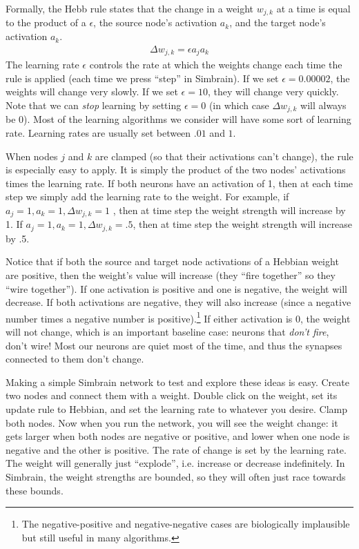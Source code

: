 Formally,  the Hebb rule states that the change in a weight $w_{j,k}$ at a time is 
equal to the product of a  $\epsilon$, the source node's 
activation $a_k$, and the target node's activation $a_k$. 
\begin{eqnarray*}
\Delta w_{j,k} = \epsilon a_j a_k
\end{eqnarray*}
The learning rate $\epsilon$ controls the rate at which the weights change each time the rule is applied (each time we press ``step'' in Simbrain). If we set $\epsilon=0.00002$, the weights will change very slowly. If we set $\epsilon=10$, they will change very quickly. Note that we can \emph{stop} learning by setting $\epsilon=0$ (in which case $\Delta w_{j,k}$ will always be 0). Most of the learning algorithms we consider will have some sort of learning rate. Learning rates are usually set between $.01$ and $1$.

When nodes $j$ and $k$ are clamped (so that their activations can't change), the rule is especially easy to apply. It is simply the product of the two nodes' activations times the learning rate. If both neurons have an activation of 1, then at each time step we simply add the learning rate to the weight. For example, if $a_j = 1, a_k=1, \Delta w_{j,k} =1$ , then at time step the weight strength will increase by 1.  If $a_j = 1, a_k=1, \Delta w_{j,k}= .5$, then at time step the weight strength will increase by .5.

Notice that if both the source and target node activations of a Hebbian weight are positive, then the weight's value will increase (they ``fire together'' so they ``wire together''). If one activation is positive and one is negative, the weight will decrease. If both activations are negative, they will also increase (since a negative number times a negative number is positive).\footnote{The negative-positive and negative-negative cases are biologically implausible but still useful in many algorithms.}  If either activation is 0, the weight will not change, which is an important baseline case: neurons that \emph{don't fire}, don't wire! Most our neurons are quiet most of the time, and thus the synapses connected to them don't change. 

Making a simple Simbrain network to test and explore these ideas is easy. Create two nodes and connect them with a weight. Double click on the weight, set its update rule to Hebbian, and set the learning rate to whatever you desire. Clamp both nodes. Now when you run the network, you will see the weight change: it gets larger when both nodes are negative or positive, and lower when one node is negative and the other is positive. The rate of change is set by the learning rate. The weight will generally just ``explode'', i.e. increase or decrease indefinitely. In Simbrain, the weight strengths are bounded, so they will often just race towards these bounds. 

